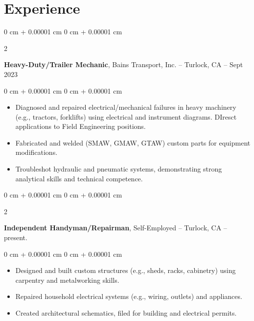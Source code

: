 \documentclass[10pt, letterpaper]{article}
\newenvironment{highlights}{
    \begin{itemize}[
        topsep=0.10 cm,
        parsep=0.10 cm,
        partopsep=0pt,
        itemsep=0pt,
        leftmargin=0 cm + 10pt
    ]
}{
    \end{itemize}
} %
\newenvironment{onecolentry}{
    \begin{adjustwidth}{
        0 cm + 0.00001 cm
    }{
        0 cm + 0.00001 cm
    }
}{
    \end{adjustwidth}
} %
\newenvironment{twocolentry}[2][]{
    \onecolentry
    \def\secondColumn{#2}
    \setcolumnwidth{\fill, 4.5 cm}
    \begin{paracol}{2}
}{
    \switchcolumn \raggedleft \secondColumn
    \end{paracol}
    \endonecolentry
} %
\begin{document}
    \section{Experience}

        \begin{twocolentry}{
            2016 – Sept 2023
        }
            \textbf{Heavy-Duty/Trailer Mechanic}, Bains Transport, Inc. -- Turlock, CA \end{twocolentry}

        \vspace{0.10 cm}
        \begin{onecolentry}
            \begin{highlights}
                \item Diagnosed and repaired electrical/mechanical failures in heavy machinery (e.g., tractors, forklifts) using electrical and instrument diagrams. DIresct applications to Field Engineering positions.
                \item Fabricated and welded (SMAW, GMAW, GTAW) custom parts for equipment modifications.
                \item Troubleshot hydraulic and pneumatic systems, demonstrating strong analytical skills and technical competence.
            \end{highlights}
        \end{onecolentry}

        \vspace{0.2 cm}

        \begin{twocolentry}{
            2018 – present.
        }
            \textbf{Independent Handyman/Repairman}, Self-Employed -- Turlock, CA \end{twocolentry}

        \vspace{0.10 cm}
        \begin{onecolentry}
            \begin{highlights}
                \item Designed and built custom structures (e.g., sheds, racks, cabinetry) using carpentry and metalworking skills.
                \item Repaired household electrical systems (e.g., wiring, outlets) and appliances.
                \item Created architectural schematics, filed for building and electrical permits. 
            \end{highlights}
        \end{onecolentry}
\end{document}
